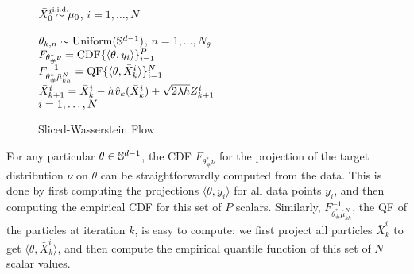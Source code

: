 \begin{wrapfigure}{R}{0.52\textwidth}
\vspace{-1pt}
    \begin{minipage}{0.52\textwidth}
     \begin{algorithm2e} [H]
		 \SetInd{0.1ex}{1.5ex}
		 \DontPrintSemicolon
		 {\color{purple} \small {}}
		 $\bar{X}_0^i \simiid \mu_0$, \hfill $i = 1,\dots,N$ \\
     {
		    {\color{purple} \small {}}
		    $\theta_{k,n} \sim \mathrm{Uniform}(\mathbb{S}^{d-1})$, \hfill $n = 1,\dots,N_\theta$\\
        {
        {\color{purple} \small {}}
        $F_{\theta^*_\#\nu}=\textnormal{CDF}\{\langle\theta,y_i\rangle\}_{i=1}^P$\\
        {\color{purple} \small {}}
        $F^{-1}_{\theta^*_\#\bar{\mu}_{kh}^{N}}=\textnormal{QF}\{\langle\theta,\bar{X}_k^i\rangle\}_{i=1}^N$\\
        }
        {\color{purple} \small {}}
        $\bar{X}_{k+1}^i = \bar{X}_{k}^i - h \hspace{0.5pt} \hat{v}_k(\bar{X}^i_k) + \sqrt{2 \lambda h} Z^i_{k+1}$ \vspace{2pt} \\
        $\hfill i = 1,\dots,N$

		 }
		 \caption{Sliced-Wasserstein Flow}
		 \label{algo:flow}
	 \end{algorithm2e}
\end{minipage}
\vspace{-20pt}
\end{wrapfigure}

For any particular $\theta\in\mathbb{S}^{d-1}$, the CDF $F_{\theta^*_\#\nu}$ for the projection of the target distribution $\nu$ on $\theta$ can be straightforwardly computed from the data. This is done by first computing the projections $\langle \theta, y_i\rangle$ for all data points $y_i$, and then computing the empirical CDF for this set of $P$ scalars.
%
Similarly, $F^{-1}_{\theta^*_\#\bar{\mu}_{kh}^{N}}$, the QF of the particles at iteration $k$, is easy to compute: we first project all particles $\bar{X}_k^i$ to get $\langle \theta, \bar{X}_k^i\rangle$, and then compute the empirical quantile function of this set of $N$ scalar values.

